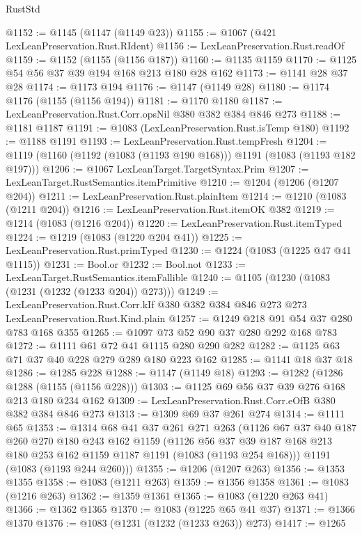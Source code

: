 \begin{lexlean}{RustStd}
\begin{coremodule}
@1152 := @1145 (@1147 (@1149 @23))
@1155 := @1067 (@421 LexLeanPreservation.Rust.RIdent)
@1156 := LexLeanPreservation.Rust.readOf
@1159 := @1152 (@1155 (@1156 @187))
@1160 := @1135 @1159
@1170 := @1125 @54 @56 @37 @39 @194 @168 @213 @180 @28 @162
@1173 := @1141 @28 @37 @28
@1174 := @1173 @194
@1176 := @1147 (@1149 @28)
@1180 := @1174 @1176 (@1155 (@1156 @194))
@1181 := @1170 @1180
@1187 := LexLeanPreservation.Rust.Corr.opsNil @380 @382 @384 @846 @273
@1188 := @1181 @1187
@1191 := @1083 (LexLeanPreservation.Rust.isTemp @180)
@1192 := @1188 @1191
@1193 := LexLeanPreservation.Rust.tempFresh
@1204 := @1119 (@1160 (@1192 (@1083 (@1193 @190 @168))) @1191 (@1083 (@1193 @182 @197)))
@1206 := @1067 LexLeanTarget.TargetSyntax.Prim
@1207 := LexLeanTarget.RustSemantics.itemPrimitive
@1210 := @1204 (@1206 (@1207 @204))
@1211 := LexLeanPreservation.Rust.plainItem
@1214 := @1210 (@1083 (@1211 @204))
@1216 := LexLeanPreservation.Rust.itemOK @382
@1219 := @1214 (@1083 (@1216 @204))
@1220 := LexLeanPreservation.Rust.itemTyped
@1224 := @1219 (@1083 (@1220 @204 @41))
@1225 := LexLeanPreservation.Rust.primTyped
@1230 := @1224 (@1083 (@1225 @47 @41 @1115))
@1231 := Bool.or
@1232 := Bool.not
@1233 := LexLeanTarget.RustSemantics.itemFallible
@1240 := @1105 (@1230 (@1083 (@1231 (@1232 (@1233 @204)) @273)))
@1249 := LexLeanPreservation.Rust.Corr.kIf
    @380
    @382
    @384
    @846
    @273
    @273
    LexLeanPreservation.Rust.Kind.plain
@1257 := @1249 @218 @91 @54 @37 @280 @783 @168 @355
@1265 := @1097 @73 @52 @90 @37 @280 @292 @168 @783
@1272 := @1111 @61 @72 @41 @1115 @280 @290 @282
@1282 := @1125 @63 @71 @37 @40 @228 @279 @289 @180 @223 @162
@1285 := @1141 @18 @37 @18
@1286 := @1285 @228
@1288 := @1147 (@1149 @18)
@1293 := @1282 (@1286 @1288 (@1155 (@1156 @228)))
@1303 := @1125 @69 @56 @37 @39 @276 @168 @213 @180 @234 @162
@1309 := LexLeanPreservation.Rust.Corr.eOfB @380 @382 @384 @846 @273
@1313 := @1309 @69 @37 @261 @274
@1314 := @1111 @65
@1353 := @1314
    @68
    @41
    @37
    @261
    @271
    @263
    (@1126
      @67
      @37
      @40
      @187
      @260
      @270
      @180
      @243
      @162
      @1159
      (@1126 @56 @37 @39 @187 @168 @213 @180 @253 @162 @1159 @1187 @1191 (@1083 (@1193 @254 @168)))
      @1191
      (@1083 (@1193 @244 @260)))
@1355 := @1206 (@1207 @263)
@1356 := @1353 @1355
@1358 := @1083 (@1211 @263)
@1359 := @1356 @1358
@1361 := @1083 (@1216 @263)
@1362 := @1359 @1361
@1365 := @1083 (@1220 @263 @41)
@1366 := @1362 @1365
@1370 := @1083 (@1225 @65 @41 @37)
@1371 := @1366 @1370
@1376 := @1083 (@1231 (@1232 (@1233 @263)) @273)
@1417 := @1265

\end{coremodule}
\end{lexlean}
